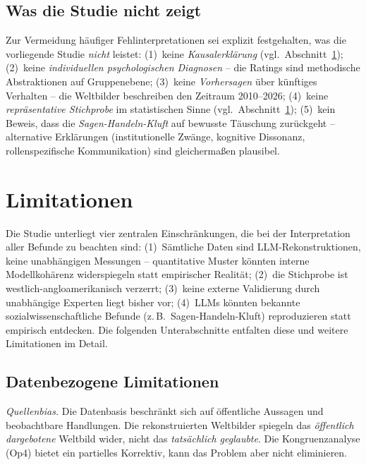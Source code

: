 \documentclass[12pt,a4paper]{article}
\begin{document}
\subsection{Was die Studie nicht zeigt}
\label{sec:diskussion:negativ}

Zur Vermeidung h\"aufiger Fehlinterpretationen sei explizit festgehalten, was die vorliegende Studie \emph{nicht} leistet: (1)~keine \emph{Kausalerkl\"arung} (vgl.\ Abschnitt~\ref{sec:limitationen}); (2)~keine \emph{individuellen psychologischen Diagnosen} -- die Ratings sind methodische Abstraktionen auf Gruppenebene; (3)~keine \emph{Vorhersagen} \"uber k\"unftiges Verhalten -- die Weltbilder beschreiben den Zeitraum 2010--2026; (4)~keine \emph{repr\"asentative Stichprobe} im statistischen Sinne (vgl.\ Abschnitt~\ref{sec:limitationen}); (5)~kein Beweis, dass die \emph{Sagen-Handeln-Kluft} auf bewusste T\"auschung zur\"uckgeht -- alternative Erkl\"arungen (institutionelle Zw\"ange, kognitive Dissonanz, rollenspezifische Kommunikation) sind gleicherma\ss{}en plausibel.


\section{Limitationen}
\label{sec:limitationen}

Die Studie unterliegt vier zentralen Einschr\"ankungen, die bei der Interpretation aller Befunde zu beachten sind: (1)~S\"amtliche Daten sind LLM-Rekonstruktionen, keine unabh\"angigen Messungen -- quantitative Muster k\"onnten interne Modellkoh\"arenz widerspiegeln statt empirischer Realit\"at; (2)~die Stichprobe ist westlich-angloamerikanisch verzerrt; (3)~keine externe Validierung durch unabh\"angige Experten liegt bisher vor; (4)~LLMs k\"onnten bekannte sozialwissenschaftliche Befunde (z.\,B.\ Sagen-Handeln-Kluft) reproduzieren statt empirisch entdecken. Die folgenden Unterabschnitte entfalten diese und weitere Limitationen im Detail.

\subsection{Datenbezogene Limitationen}

\emph{Quellenbias.} Die Datenbasis beschr\"ankt sich auf \"offentliche Aussagen und beobachtbare Handlungen. Die rekonstruierten Weltbilder spiegeln das \emph{\"offentlich dargebotene} Weltbild wider, nicht das \emph{tats\"achlich geglaubte}. Die Kongruenzanalyse (Op4) bietet ein partielles Korrektiv, kann das Problem aber nicht eliminieren.
\end{document}

